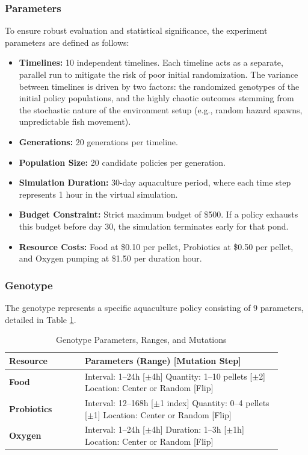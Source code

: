 \documentclass[conference]{IEEEtran}
\begin{document}
\subsubsection{Parameters}
To ensure robust evaluation and statistical significance, the experiment parameters are defined as follows:
\begin{itemize}
    \item \textbf{Timelines:} 10 independent timelines. Each timeline acts as a separate, parallel run to mitigate the risk of poor initial randomization. The variance between timelines is driven by two factors: the randomized genotypes of the initial policy populations, and the highly chaotic outcomes stemming from the stochastic nature of the environment setup (e.g., random hazard spawns, unpredictable fish movement).
    \item \textbf{Generations:} 20 generations per timeline.
    \item \textbf{Population Size:} 20 candidate policies per generation.
    \item \textbf{Simulation Duration:} 30-day aquaculture period, where each time step represents 1 hour in the virtual simulation.
    \item \textbf{Budget Constraint:} Strict maximum budget of \$500. If a policy exhausts this budget before day 30, the simulation terminates early for that pond.
    \item \textbf{Resource Costs:} Food at \$0.10 per pellet, Probiotics at \$0.50 per pellet, and Oxygen pumping at \$1.50 per duration hour.
\end{itemize}

\subsubsection{Genotype}
The genotype represents a specific aquaculture policy consisting of 9 parameters, detailed in Table \ref{tab:genotype}.

\begin{table}[htbp]
\centering
\caption{Genotype Parameters, Ranges, and Mutations}
\label{tab:genotype}
\begin{tabular}{|p{0.25\linewidth}|p{0.65\linewidth}|}
\hline
\textbf{Resource} & \textbf{Parameters (Range) [Mutation Step]} \\ \hline
\textbf{Food} & Interval: 1--24h [$\pm$4h] \newline Quantity: 1--10 pellets [$\pm$2] \newline Location: Center or Random [Flip] \\ \hline
\textbf{Probiotics} & Interval: 12--168h [$\pm$1 index] \newline Quantity: 0--4 pellets [$\pm$1] \newline Location: Center or Random [Flip] \\ \hline
\textbf{Oxygen} & Interval: 1--24h [$\pm$4h] \newline Duration: 1--3h [$\pm$1h] \newline Location: Center or Random [Flip] \\ \hline
\end{tabular}
\end{table}
\end{document}
